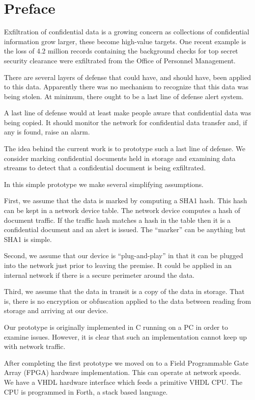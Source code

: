 \chapter{Preface}
Exfiltration of confidential data is a growing concern as collections
of confidential information grow larger, these become high-value
targets. One recent example is the loss of 4.2 million records
containing the background checks for top secret security clearance
were exfiltrated from the Office of Personnel Management.

There are several layers of defense that could have, and should have,
been applied to this data. Apparently there was no mechanism to
recognize that this data was being stolen. At minimum, there ought to
be a last line of defense alert system.

A last line of defense would at least make people aware that 
confidential data was being copied. It should monitor the network
for confidential data transfer and, if any is found, raise an alarm.

The idea behind the current work is to prototype such a last line of
defense. We consider marking confidential documents held in storage
and examining data streams to detect that a confidential document is
being exfiltrated.

In this simple prototype we make several simplifying assumptions.

First, we assume that the data is marked by computing a SHA1 hash.
This hash can be kept in a network device table. The network device
computes a hash of document traffic. If the traffic hash matches a
hash in the table then it is a confidential document and an alert is
issued. The ``marker'' can be anything but SHA1 is simple.

Second, we assume that our device is ``plug-and-play'' in that it can
be plugged into the network just prior to leaving the premise.  It
could be applied in an internal network if there is a secure perimeter
around the data.

Third, we assume that the data in transit is a copy of the data in
storage. That is, there is no encryption or obfuscation applied to the
data between reading from storage and arriving at our device.

Our prototype is originally implemented in C running on a PC in order
to examine issues. However, it is clear that such an implementation
cannot keep up with network traffic.

After completing the first prototype we moved on to a Field
Programmable Gate Array (FPGA) hardware implementation. This can
operate at network speeds. We have a VHDL hardware interface which
feeds a primitive VHDL CPU. The CPU is programmed in Forth, a stack
based language.

